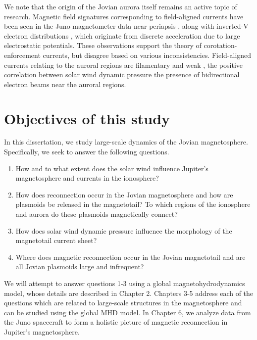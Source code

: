 We note that the origin of the Jovian aurora itself remains an active topic of research. Magnetic field signatures corresponding to field-aligned currents have been seen in the Juno magnetometer data near periapsis \cite{Kotsiaros2019BirkelandSpacecraft}, along with inverted-V electron distributions \cite{Mauk2017TheMission}, which originate from discrete acceleration due to large electrostatic potentials. These observations support the theory of corotation-enforcement currents, but  disagree based on various inconsistencies. Field-aligned currents relating to the auroral regions are filamentary and weak \cite{Kotsiaros2019BirkelandSpacecraft}, the positive correlation between solar wind dynamic pressure the presence of bidirectional electron beams near the auroral regions. 

\section{Objectives of this study}
In this dissertation, we study large-scale dynamics of the Jovian magnetosphere. Specifically, we seek to answer the following questions. 
\begin{enumerate}
    \item How and to what extent does the solar wind influence Jupiter's magnetosphere and currents in the ionosphere?
    \item How does reconnection occur in the Jovian magnetosphere and how are plasmoids be released in the magnetotail? To which regions of the ionosphere and aurora do these plasmoids magnetically connect?
    \item How does solar wind dynamic pressure influence the morphology of the magnetotail current sheet?
    \item Where does magnetic reconnection occur in the Jovian magnetotail and are all Jovian plasmoids large and infrequent?
\end{enumerate}

We will attempt to answer questions 1-3 using a global magnetohydrodynamics model, whose details are described in Chapter 2. Chapters 3-5 address each of the questions which are related to large-scale structures in the magnetosphere and can be studied using the global MHD model. In Chapter 6, we analyze data from the Juno spacecraft to form a holistic picture of magnetic reconnection in Jupiter's magnetosphere. 


